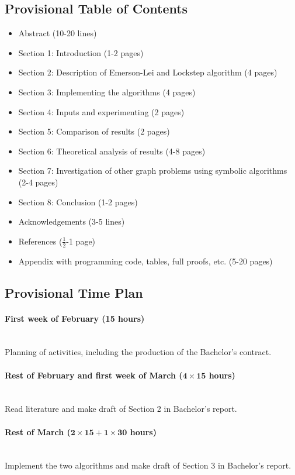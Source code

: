 \documentclass{article}
\newcommand{\timeest}[1]{$\mathbf{#1}$}%
\begin{document}
\subsection*{Provisional Table of Contents}
\begin{itemize}
    \item Abstract (10-20 lines)
    \item Section 1: Introduction (1-2 pages)
    \item Section 2: Description of Emerson-Lei and Lockstep algorithm (4 pages)
    \item Section 3: Implementing the algorithms (4 pages)
    \item Section 4: Inputs and experimenting (2 pages)
    \item Section 5: Comparison of results (2 pages)
    \item Section 6: Theoretical analysis of results (4-8 pages)
    \item Section 7: Investigation of other graph problems using symbolic algorithms (2-4 pages)
    \item Section 8: Conclusion (1-2 pages)
    \item Acknowledgements (3-5 lines)
    \item References ($\frac{1}{2}$-1 page)
    \item Appendix with programming code, tables, full proofs, etc. (5-20 pages)
\end{itemize}

\subsection*{Provisional Time Plan}

\paragraph{First week of February (15 hours)}~\\\noindent
Planning of activities, including the production of the Bachelor's contract.

\paragraph{Rest of February and first week of March (\timeest{4\times 15} hours)}~\\\noindent
Read literature and make draft of Section 2 in Bachelor's report.

\paragraph{Rest of March (\timeest{2\times 15+1\times 30} hours)}~\\\noindent
Implement the two algorithms and make draft of Section 3 in Bachelor's report.
\end{document}
